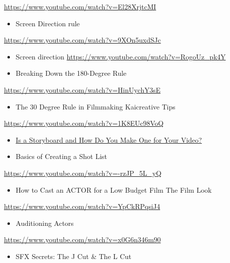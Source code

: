 \documentclass[
]{book}
\providecommand{\tightlist}{%
  \setlength{\itemsep}{0pt}\setlength{\parskip}{0pt}}
\begin{document}
\url{https://www.youtube.com/watch?v=El28XrjtcMI}

\begin{itemize}
\tightlist
\item
  Screen Direction rule
\end{itemize}

\url{https://www.youtube.com/watch?v=9XOn5uxdSJc}

\begin{itemize}
\tightlist
\item
  Screen direction
  \url{https://www.youtube.com/watch?v=RogoUz_pk4Y}
\end{itemize}

\begin{itemize}
\tightlist
\item
  Breaking Down the 180-Degree Rule
\end{itemize}

\url{https://www.youtube.com/watch?v=HinUychY3sE}

\begin{itemize}
\tightlist
\item
  The 30 Degree Rule in Filmmaking \textbar{} Kaicreative \textbar{} Tips
\end{itemize}

\url{https://www.youtube.com/watch?v=1K8EUc98VoQ}

\begin{itemize}
\item
  \href{https://www.wyzowl.com/what-is-a-storyboard/What}{Is a Storyboard and How Do You Make One for Your Video?}
\item
  Basics of Creating a Shot List
\end{itemize}

\url{https://www.youtube.com/watch?v=-rzJP_5L_yQ}

\begin{itemize}
\tightlist
\item
  How to Cast an ACTOR for a Low Budget Film \textbar{} The Film Look
\end{itemize}

\url{https://www.youtube.com/watch?v=YpCkRPqsiJ4}

\begin{itemize}
\tightlist
\item
  Auditioning Actors
\end{itemize}

\url{https://www.youtube.com/watch?v=x0G6n346m90}

\begin{itemize}
\tightlist
\item
  SFX Secrets: The J Cut \& The L Cut
\end{itemize}
\end{document}
